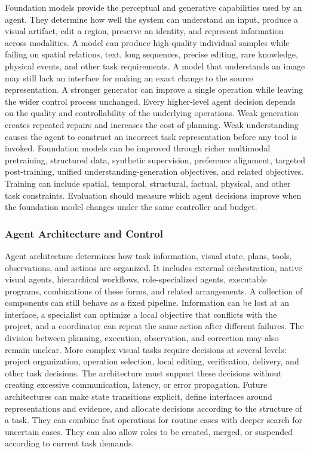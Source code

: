 Foundation models provide the perceptual and generative capabilities used by an agent. They determine how well the system can understand an input, produce a visual artifact, edit a region, preserve an identity, and represent information across modalities. A model can produce high-quality individual samples while failing on spatial relations, text, long sequences, precise editing, rare knowledge, physical events, and other task requirements. A model that understands an image may still lack an interface for making an exact change to the source representation. A stronger generator can improve a single operation while leaving the wider control process unchanged. Every higher-level agent decision depends on the quality and controllability of the underlying operations. Weak generation creates repeated repairs and increases the cost of planning. Weak understanding causes the agent to construct an incorrect task representation before any tool is invoked. Foundation models can be improved through richer multimodal pretraining, structured data, synthetic supervision, preference alignment, targeted post-training, unified understanding-generation objectives, and related objectives. Training can include spatial, temporal, structural, factual, physical, and other task constraints. Evaluation should measure which agent decisions improve when the foundation model changes under the same controller and budget.


\subsubsection{Agent Architecture and Control}

Agent architecture determines how task information, visual state, plans, tools, observations, and actions are organized. It includes external orchestration, native visual agents, hierarchical workflows, role-specialized agents, executable programs, combinations of these forms, and related arrangements. A collection of components can still behave as a fixed pipeline. Information can be lost at an interface, a specialist can optimize a local objective that conflicts with the project, and a coordinator can repeat the same action after different failures. The division between planning, execution, observation, and correction may also remain unclear. More complex visual tasks require decisions at several levels: project organization, operation selection, local editing, verification, delivery, and other task decisions. The architecture must support these decisions without creating excessive communication, latency, or error propagation. Future architectures can make state transitions explicit, define interfaces around representations and evidence, and allocate decisions according to the structure of a task. They can combine fast operations for routine cases with deeper search for uncertain cases. They can also allow roles to be created, merged, or suspended according to current task demands.


